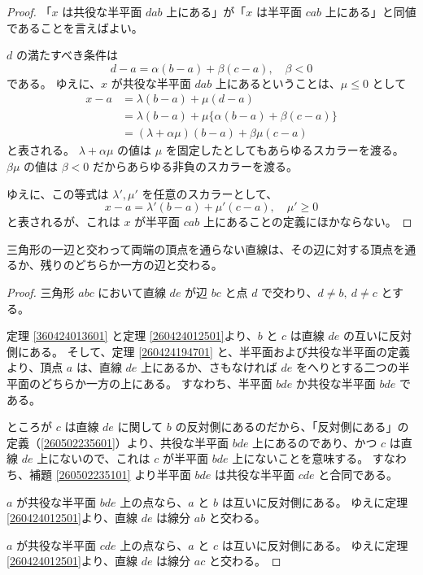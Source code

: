 \begin{proof}
  「\(x\) は共役な半平面 \(dab\) 上にある」が「\(x\) は半平面 \(cab\) 上にある」と同値であることを言えばよい。

  \(d\) の満たすべき条件は
  \[d-a=\alpha(b-a)+\beta(c-a),\quad \beta<0\]
  である。
  ゆえに、\(x\) が共役な半平面 \(dab\) 上にあるということは、\(\mu\leq 0\) として
  \begin{align*}
    x-a &=\lambda(b-a)+\mu(d-a) \\
        &=\lambda(b-a)+\mu\{\alpha(b-a)+\beta(c-a)\} \\
        &=(\lambda+\alpha\mu)(b-a)+\beta\mu(c-a)
  \end{align*}
  と表される。
  \(\lambda+\alpha\mu\) の値は \(\mu\) を固定したとしてもあらゆるスカラーを渡る。
  \(\beta\mu\) の値は \(\beta<0\) だからあらゆる非負のスカラーを渡る。

  ゆえに、この等式は \(\lambda',\mu'\) を任意のスカラーとして、
  \[x-a=\lambda'(b-a)+\mu'(c-a),\quad \mu'\geq 0\]
  と表されるが、これは \(x\) が半平面 \(cab\) 上にあることの定義にほかならない。
\end{proof}


\begin{thm}
  三角形の一辺と交わって両端の頂点を通らない直線は、その辺に対する頂点を通るか、残りのどちらか一方の辺と交わる。
\end{thm}

\begin{proof}
  三角形 \(abc\) において直線 \(de\) が辺 \(bc\) と点 \(d\) で交わり、\(d\neq b,\ d\neq c\) とする。

  定理 \ref{360424013601} と定理 \ref{260424012501}より、\(b\) と \(c\) は直線 \(de\) の互いに反対側にある。
  そして、定理 \ref{260424194701} と、半平面および共役な半平面の定義より、頂点 \(a\) は、直線 \(de\) 上にあるか、さもなければ \(de\) をへりとする二つの半平面のどちらか一方の上にある。
  すなわち、半平面 \(bde\) か共役な半平面 \(bde\) である。

  ところが \(c\) は直線 \(de\) に関して \(b\) の反対側にあるのだから、「反対側にある」の定義（\ref{260502235601}）より、共役な半平面 \(bde\) 上にあるのであり、かつ \(c\) は直線 \(de\) 上にないので、これは \(c\) が半平面 \(bde\) 上にないことを意味する。
  すなわち、補題 \ref{260502235101} より半平面 \(bde\) は共役な半平面 \(cde\) と合同である。

  \(a\) が共役な半平面 \(bde\) 上の点なら、\(a\) と \(b\) は互いに反対側にある。
  ゆえに定理 \ref{260424012501}より、直線 \(de\) は線分 \(ab\) と交わる。

  \(a\) が共役な半平面 \(cde\) 上の点なら、\(a\) と \(c\) は互いに反対側にある。
  ゆえに定理 \ref{260424012501}より、直線 \(de\) は線分 \(ac\) と交わる。
\end{proof}

